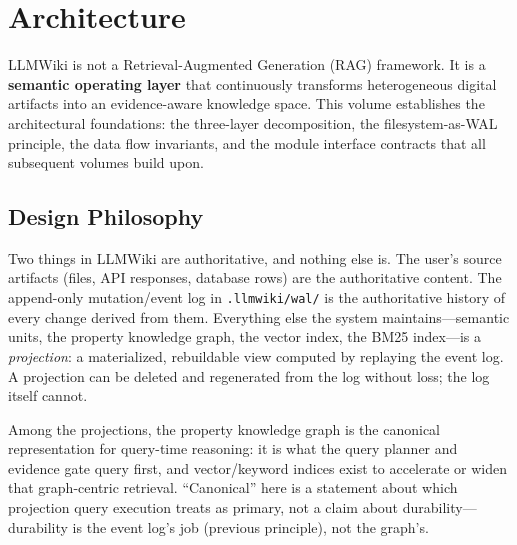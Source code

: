 \chapter{Architecture}
\label{cha:architecture}

LLMWiki is not a Retrieval-Augmented Generation (RAG) framework. It is a \textbf{semantic operating layer} that continuously transforms heterogeneous digital artifacts into an evidence-aware knowledge space. This volume establishes the architectural foundations: the three-layer decomposition, the filesystem-as-WAL principle, the data flow invariants, and the module interface contracts that all subsequent volumes build upon.

\section{Design Philosophy}
\label{sec:architecture:philosophy}

\begin{designprinciple}
Two things in LLMWiki are authoritative, and nothing else is. The user's source artifacts (files, API responses, database rows) are the authoritative content. The append-only mutation/event log in \texttt{.llmwiki/wal/} is the authoritative history of every change derived from them. Everything else the system maintains---semantic units, the property knowledge graph, the vector index, the BM25 index---is a \emph{projection}: a materialized, rebuildable view computed by replaying the event log. A projection can be deleted and regenerated from the log without loss; the log itself cannot.
\end{designprinciple}

\begin{designprinciple}
Among the projections, the property knowledge graph is the canonical representation for query-time reasoning: it is what the query planner and evidence gate query first, and vector/keyword indices exist to accelerate or widen that graph-centric retrieval. ``Canonical'' here is a statement about which projection query execution treats as primary, not a claim about durability---durability is the event log's job (previous principle), not the graph's.
\end{designprinciple}

